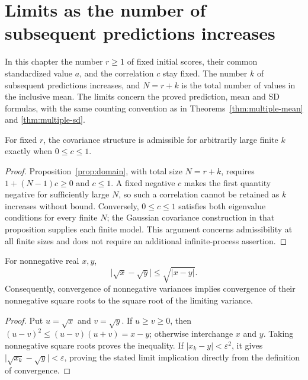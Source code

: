 \chapter{Limits as the number of subsequent predictions increases}
\label{sec:asymptotic-limits}

In this chapter the number \(r\geq1\) of fixed initial scores, their common
standardized value \(a\), and the correlation \(c\) stay fixed. The number
\(k\) of subsequent predictions increases, and \(N=r+k\) is the total
number of values in the inclusive mean. The limits concern the proved
prediction, mean and SD formulas, with the same counting convention as in
Theorems~\ref{thm:multiple-mean} and \ref{thm:multiple-sd}.

\begin{proposition}
\label{prop:limit-domain}
For fixed \(r\), the covariance structure is admissible for arbitrarily
large finite \(k\) exactly when \(0\leq c\leq1\).
\end{proposition}
\begin{proof}
Proposition~\ref{prop:domain}, with total size \(N=r+k\), requires
\(1+(N-1)c\geq0\) and \(c\leq1\). A fixed negative \(c\) makes the
first quantity negative for sufficiently large \(N\), so such a
correlation cannot be retained as \(k\) increases without bound.
Conversely, \(0\leq c\leq1\) satisfies both eigenvalue conditions for
every finite \(N\); the Gaussian covariance construction in that
proposition supplies each finite model. This argument concerns
admissibility at all finite sizes and does not require an additional
infinite-process assertion.
\end{proof}

\begin{lemma}
\label{lem:square-root-limit-bound}
For nonnegative real \(x,y\),
\[
 \lvert\sqrt{x}-\sqrt{y}\rvert\leq\sqrt{\lvert x-y\rvert}.
\]
Consequently, convergence of nonnegative variances implies convergence of
their nonnegative square roots to the square root of the limiting variance.
\end{lemma}
\begin{proof}
Put \(u=\sqrt{x}\) and \(v=\sqrt{y}\). If \(u\geq v\geq0\), then
\((u-v)^2\leq(u-v)(u+v)=x-y\); otherwise interchange \(x\) and \(y\).
Taking nonnegative square roots proves the inequality. If
\(\lvert x_k-y\rvert<\varepsilon^2\), it gives
\(\lvert\sqrt{x_k}-\sqrt y\rvert<\varepsilon\), proving the stated
limit implication directly from the definition of convergence.
\end{proof}


